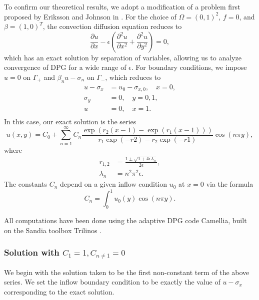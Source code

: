 \documentclass[11pt,onecolumn]{scrartcl}
\newcommand{\pd}[2]{\frac{\partial#1}{\partial#2}}
\newcommand{\pdd}[2]{\frac{\partial^2#1}{\partial#2^2}}
\begin{document}
To confirm our theoretical results, we adopt a modification of a problem first proposed by Eriksson and Johnson in \cite{Eriksson1993}. For the choice of $\Omega = (0,1)^2$, $f=0$, and $\beta = (1,0)^T$, the convection diffusion equation reduces to
\[
\pd{u}{x} - \epsilon \left(\pdd{u}{x}+ \pdd{u}{y}\right) = 0,
\]
which has an exact solution by separation of variables, allowing us to analyze convergence of DPG for a wide range of $\epsilon$.  For boundary conditions, we impose $u=0$ on $\Gamma_+$ and $\beta_n u - \sigma_n$ on $\Gamma_-$, which reduces to
\begin{align*}
u-\sigma_x &= u_0-\sigma_{x,0}, \quad x=0,\\
\sigma_y &=  0, \quad y=0,1,\\
u &= 0, \quad x=1.\\
\end{align*}
In this case, our exact solution is the series
\[
u(x,y) = C_0 + \sum_{n=1}^\infty C_n \frac{\exp(r_2(x-1)-\exp(r_1(x-1)))}{r_1\exp(-r2) - r_2\exp(-r1)}\cos(n\pi y),
\]
where
\begin{align*}
r_{1,2} &= \frac{1 \pm \sqrt{1 + 4 \epsilon\lambda_n}}{2 \epsilon},\\
\lambda_n &= n^2\pi^2 \epsilon.
\end{align*}
The constants $C_n$ depend on a given inflow condition $u_0$ at $x=0$ via the formula
\[
C_n = \int_0^1 u_0(y) \cos(n\pi y).
\]

All computations have been done using the adaptive DPG code Camellia, built on the Sandia toolbox Trilinos \cite{Camellia}.

\subsubsection{Solution with $C_1 = 1, C_{n\neq 1} = 0$}

We begin with the solution taken to be the first non-constant term of the above series.  We set the inflow boundary condition to be exactly the value of $u-\sigma_x$ corresponding to the exact solution.  
\end{document}
